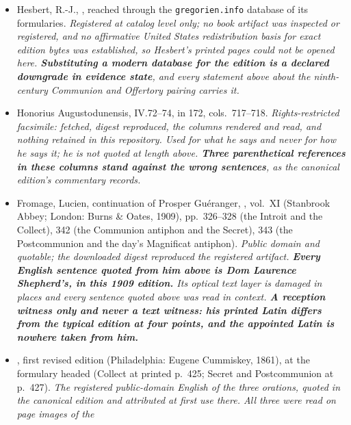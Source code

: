 \begin{itemize}[leftmargin=1.2em, itemsep=0.15em]
{ and . \textbf{No decree in it pairs a preface
grant with the Sundays after Pentecost}, which is why the extension of the
Trinity preface to them is unlocated and its common attribution is not
asserted.}
\item Hesbert, R.-J., , reached through
the \texttt{gregorien.info} database of its formularies. \textit{Registered at
catalog level only; no book artifact was inspected or registered, and no
affirmative United States redistribution basis for exact edition bytes was
established, so Hesbert's printed pages could not be opened here.
\textbf{Substituting a modern database for the edition is a declared downgrade
in evidence state}, and every statement above about the ninth-century Communion
and Offertory pairing carries it.}
\item Honorius Augustodunensis,  IV.72--74, in
 172, cols.~717--718. \textit{Rights-restricted
facsimile: fetched, digest reproduced, the columns rendered and read, and
nothing retained in this repository. Used for what he says and never for how he
says it; he is not quoted at length above. \textbf{Three parenthetical
references in these columns stand against the wrong sentences}, as the
canonical edition's commentary records.}
\item Fromage, Lucien, continuation of Prosper Guéranger, , vol.~XI (Stanbrook Abbey; London: Burns \& Oates, 1909), pp.~326--328 (the Introit and the Collect), 342 (the Communion antiphon
and the Secret), 343 (the Postcommunion and the day's Magnificat antiphon).
\textit{Public domain and quotable; the downloaded digest reproduced the
registered artifact. \textbf{Every English sentence quoted from him above is
Dom Laurence Shepherd's, in this 1909 edition.} Its optical text layer
is damaged in places and every sentence quoted above was read in context.
\textbf{A reception witness only and never a text witness: his printed Latin
differs from the typical edition at four points, and the appointed Latin is
nowhere taken from him.}}
\item {}, first revised edition (Philadelphia: Eugene Cummiskey, 1861), at
the formulary headed  (Collect at printed
p.~425; Secret and Postcommunion at p.~427). \textit{The registered
public-domain English of the three orations, quoted in the canonical edition
and attributed at first use there. All three were read on page images of the
}
\end{itemize}
